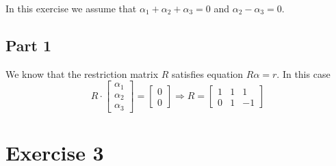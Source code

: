 \documentclass[12pt, a4paper]{article}\usepackage[]{graphicx}\usepackage[]{color}
\begin{document}
In this exercise we assume that $\alpha_1 + \alpha_2 + \alpha_3 = 0$ and $\alpha_2 - \alpha_3 = 0$. 

\subsection{Part 1}
We know that the restriction matrix $R$ satisfies equation $R \alpha = r$. In this case 
\[ 
  R \cdot
  \begin{bmatrix}  
      \alpha_1 \\ \alpha_2 \\ \alpha_3
  \end{bmatrix} 
  =
  \begin{bmatrix}  
    0 \\ 0
  \end{bmatrix} 
  \Rightarrow
  R = 
  \begin{bmatrix}  
    1 & 1 & 1 \\
    0 & 1 & -1
  \end{bmatrix}
\]

















\section{Exercise 3}


\end{document}
